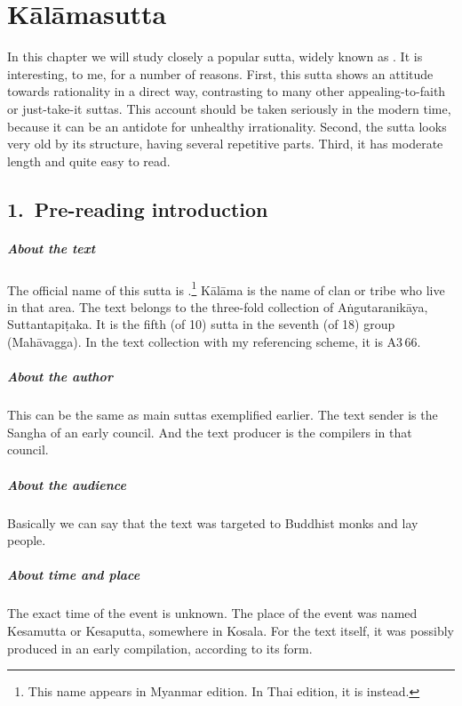 \chapter{K\=al\=amasutta}\label{chap:kalama}

In this chapter we will study closely a popular sutta, widely known as . It is interesting, to me, for a number of reasons. First, this sutta shows an attitude towards rationality in a direct way, contrasting to many other appealing-to-faith or just-take-it suttas. This account should be taken seriously in the modern time, because it can be an antidote for unhealthy irrationality. Second, the sutta looks very old by its structure, having several repetitive parts. Third, it has moderate length and quite easy to read.

{}
\section*{1.\ Pre-reading introduction}

\paragraph*{About the text} The official name of this sutta is .\footnote{This name appears in Myanmar edition. In Thai edition, it is  instead.} K\=al\=ama is the name of clan or tribe who live in that area. The text belongs to the three-fold collection of A\.ngutaranik\=aya, Suttantapi\d taka. It is the fifth (of 10) sutta in the seventh (of 18) group (Mah\=avagga). In the text collection with my referencing scheme, it is A3\,66.

\paragraph*{About the author} This can be the same as main suttas exemplified earlier. The text sender is the Sangha of an early council. And the text producer is the compilers in that council.

\paragraph*{About the audience} Basically we can say that the text was targeted to Buddhist monks and lay people.
 
\paragraph*{About time and place} The exact time of the event is unknown. The place of the event was named Kesamutta or Kesaputta, somewhere in Kosala. For the text itself, it was possibly produced in an early compilation, according to its form.

